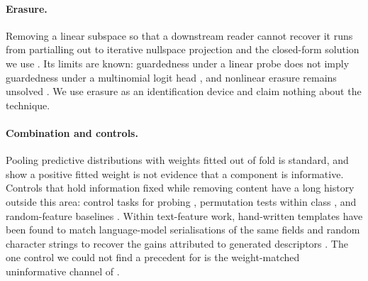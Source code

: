 \paragraph{Erasure.} Removing a linear subspace so that a downstream reader cannot recover it
runs from partialling out \citep{lovell1963seasonal} to iterative nullspace projection
\citep{ravfogel2020null} and the closed-form solution we use \citep{belrose2023leace}. Its
limits are known: guardedness under a linear probe does not imply guardedness under a
multinomial logit head \citep{ravfogel2023loglinear}, and nonlinear erasure remains unsolved
\citep{ravfogel2022kernelized}. We use erasure as an identification device and claim nothing
about the technique.

\paragraph{Combination and controls.} Pooling predictive distributions
\citep{wolpert1992stacked} with weights fitted out of fold \citep{vanderlaan2007super,
yao2018using} is standard, and \citet{geweke2011optimal} show a positive fitted weight is not
evidence that a component is informative. Controls that hold information fixed while removing
content have a long history outside this area: control tasks for probing
\citep{hewitt2019designing}, permutation tests within class \citep{ojala2010permutation}, and
random-feature baselines \citep{stoppiglia2003ranking}. Within text-feature work, hand-written
templates have been found to match language-model serialisations of the same fields
\citep{hegselmann2023tabllm} and random character strings to recover the gains attributed to
generated descriptors \citep{roth2023waffling}. The one control we could not find a precedent
for is the weight-matched uninformative channel of .
